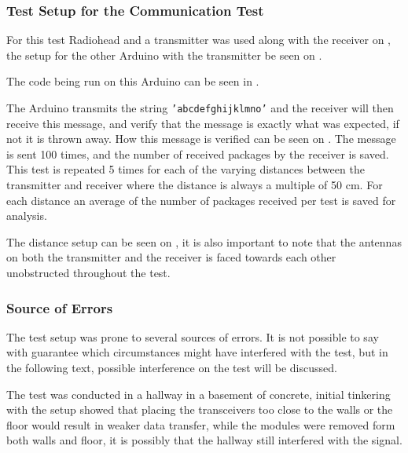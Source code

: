 \subsubsection{Test Setup for the Communication Test}

For this test Radiohead and a transmitter was used along with the receiver on , the setup for the other Arduino with the transmitter be seen on .


The code being run on this Arduino can be seen in .

The Arduino transmits the string \texttt{'abcdefghijklmno'} and the receiver will then receive this message, and verify that the message is exactly what was expected, if not it is thrown away.
How this message is verified can be seen on .
The message is sent 100 times, and the number of received packages by the receiver is saved.
This test is repeated 5 times for each of the varying distances between the transmitter and receiver where the distance is always a multiple of 50 cm. 
For each distance an average of the number of packages received per test is saved for analysis.

The distance setup can be seen on , it is also important to note that the antennas on both the transmitter and the receiver is faced towards each other unobstructed throughout the test.


\subsubsection{Source of Errors}
The test setup was prone to several sources of errors.
It is not possible to say with guarantee which circumstances might have interfered with the test, but in the following text, possible interference on the test will be discussed.

The test was conducted in a hallway in a basement  of concrete, initial tinkering with the setup showed that placing the transceivers too close to the walls or the floor would result in weaker data transfer, while the modules were removed form both walls and floor, it is possibly that the hallway still interfered with the signal. 

